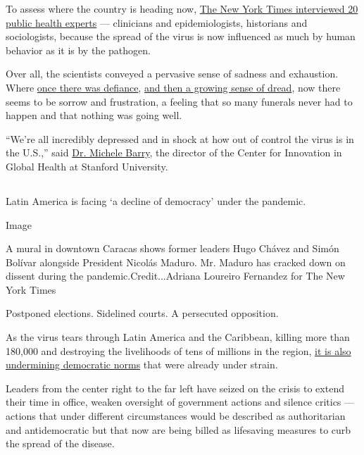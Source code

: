 To assess where the country is heading now,
\href{https://www.nytimes3xbfgragh.onion/2020/07/29/health/coronavirus-future-america.html}{The
New York Times interviewed 20 public health experts} --- clinicians and
epidemiologists, historians and sociologists, because the spread of the
virus is now influenced as much by human behavior as it is by the
pathogen.

Over all, the scientists conveyed a pervasive sense of sadness and
exhaustion. Where
\href{https://www.nytimes3xbfgragh.onion/2020/03/22/health/coronavirus-restrictions-us.html}{once
there was defiance},
\href{https://www.nytimes3xbfgragh.onion/2020/04/18/health/coronavirus-america-future.html}{and
then a growing sense of dread}, now there seems to be sorrow and
frustration, a feeling that so many funerals never had to happen and
that nothing was going well.

``We're all incredibly depressed and in shock at how out of control the
virus is in the U.S.,'' said
\href{https://profiles.stanford.edu/michele-barry}{Dr. Michele Barry},
the director of the Center for Innovation in Global Health at Stanford
University.

\hypertarget{-8}{%
\subsection{}\label{-8}}

Latin America is facing `a decline of democracy' under the pandemic.

Image

A mural in downtown Caracas shows former leaders Hugo Chávez and Simón
Bolívar alongside President Nicolás Maduro. Mr. Maduro has cracked down
on dissent during the pandemic.Credit...Adriana Loureiro Fernandez for
The New York Times

Postponed elections. Sidelined courts. A persecuted opposition.

As the virus tears through Latin America and the Caribbean, killing more
than 180,000 and destroying the livelihoods of tens of millions in the
region,
\href{https://www.nytimes3xbfgragh.onion/2020/07/29/world/americas/latin-america-democracy-pandemic.html}{it
is also undermining democratic norms} that were already under strain.

Leaders from the center right to the far left have seized on the crisis
to extend their time in office, weaken oversight of government actions
and silence critics --- actions that under different circumstances would
be described as authoritarian and antidemocratic but that now are being
billed as lifesaving measures to curb the spread of the disease.

